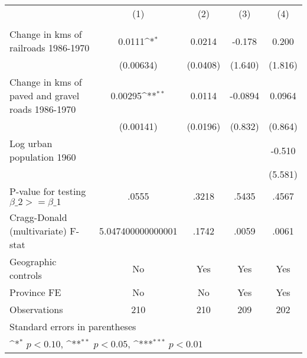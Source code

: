 {
\def\sym#1{\ifmmode^{#1}\else\(^{#1}\)\fi}
\begin{tabular}{l*{4}{c}}
\hline\hline
                &\multicolumn{1}{c}{(1)}&\multicolumn{1}{c}{(2)}&\multicolumn{1}{c}{(3)}&\multicolumn{1}{c}{(4)}\\
                &\multicolumn{1}{c}{}&\multicolumn{1}{c}{}&\multicolumn{1}{c}{}&\multicolumn{1}{c}{}\\
\hline
Change in kms of railroads 1986-1970&   0.0111\sym{*}  &   0.0214         &   -0.178         &    0.200         \\
                &(0.00634)         & (0.0408)         &  (1.640)         &  (1.816)         \\
[1em]
Change in kms of paved and gravel roads 1986-1970&  0.00295\sym{**} &   0.0114         &  -0.0894         &   0.0964         \\
                &(0.00141)         & (0.0196)         &  (0.832)         &  (0.864)         \\
[1em]
Log urban population 1960&                  &                  &                  &   -0.510         \\
                &                  &                  &                  &  (5.581)         \\
\hline
P-value for testing $\beta\_{2} >= \beta\_{1}$&    .0555         &    .3218         &    .5435         &    .4567         \\
Cragg-Donald (multivariate) F-stat&5.047400000000001         &    .1742         &    .0059         &    .0061         \\
Geographic controls&       No         &      Yes         &      Yes         &      Yes         \\
Province FE     &       No         &       No         &      Yes         &      Yes         \\
Observations    &      210         &      210         &      209         &      202         \\
\hline\hline
\multicolumn{5}{l}{\footnotesize Standard errors in parentheses}\\
\multicolumn{5}{l}{\footnotesize \sym{*} \(p<0.10\), \sym{**} \(p<0.05\), \sym{***} \(p<0.01\)}\\
\end{tabular}
}
